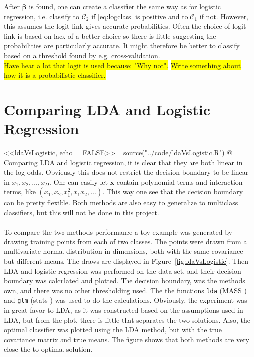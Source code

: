 After $\bm \beta$ is found, one can create a classifier the same way as for logistic regression, i.e. classify to $\mathcal{C}_2$ if \eqref{eq:logclass} is positive and to $\mathcal{C}_1$ if not. However, this assumes the logit link gives accurate probabilities. Often the choice of logit link is based on lack of a better choice so there is little suggesting the probabilities are particularly accurate. It might therefore be better to classify based on a threshold found by e.g. cross-validation. 
\\\colorbox{yellow}{Have hear a lot that logit is used because: "Why not".}
\colorbox{yellow}{Write something about how it is a probabilistic classifier.}
%
\section{Comparing LDA and Logistic Regression}
\label{sub:LDA and Logistic Regre}
<<ldaVsLogistic, echo = FALSE>>=
source("../code/ldaVsLogistic.R")
@
Comparing LDA and logistic regression, it is clear that they are both linear in the log odds. Obviously this does not restrict the decision boundary to be linear in $x_1, x_2, \ldots , x_D$. One can easily let $\mathbf{x}$ contain polynomial terms and interaction terms, like $(x_1, x_2, x_1^2, x_1 x_2, \ldots )$. This way one see that the decision boundary can be pretty flexible. Both methods are also easy to generalize to multiclass classifiers, but this will not be done in this project. \\
\\
To compare the two methods performance a toy example was generated by drawing  training points from each of two classes. The points were drawn from a multivariate normal distribution in  dimensions, both with the same covariance but different means. The draws are displayed in Figure~\ref{fig:ldaVsLogistic}. Then LDA and logistic regression was performed on the data set, and their decision boundary was calculated and plotted. The decision boundary, was the methods own, and there was no other thresholding used. The the functions \verb+lda+ (MASS \cite{mass}) and \verb+glm+ (stats \cite{stats}) was used to do the calculations. Obviously, the experiment was in great favor to LDA, as it was constructed based on the assumptions used in LDA, but from the plot, there is little that separates the two solutions. Also, the optimal classifier was plotted using the LDA method, but with the true covariance matrix and true means. The figure shows that both methods are very close the to optimal solution.

